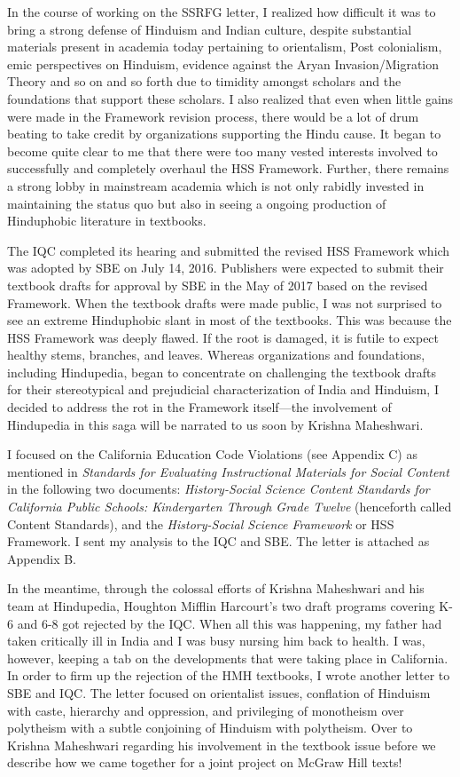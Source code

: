 In the course of working on the SSRFG letter, I realized how difficult it was to bring a strong defense of Hinduism and Indian culture, despite substantial materials present in academia today pertaining to orientalism, Post colonialism, emic perspectives on Hinduism, evidence against the Aryan Invasion/Migration Theory and so on and so forth due to timidity amongst scholars and the foundations that support these scholars. I also realized that even when little gains were made in the Framework revision process, there would be a lot of drum beating to take credit by organizations supporting the Hindu cause. It began to become quite clear to me that there were too many vested interests involved to successfully and completely overhaul the HSS Framework. Further, there remains a strong lobby in mainstream academia which is not only rabidly invested in maintaining the status quo but also in seeing a ongoing production of Hinduphobic literature in textbooks. 

The IQC completed its hearing and submitted the revised HSS Framework which was adopted by SBE on July 14, 2016. Publishers were expected to submit their textbook drafts for approval by SBE in the May of 2017 based on the revised Framework. When the textbook drafts were made public, I was not surprised to see an extreme Hinduphobic slant in most of the textbooks. This was because the HSS Framework was deeply flawed. If the root is damaged, it is futile to expect healthy stems, branches, and leaves. Whereas organizations and foundations, including Hindupedia, began to concentrate on challenging the textbook drafts for their stereotypical and prejudicial characterization of India and Hinduism, I decided to address the rot in the Framework itself—the involvement of Hindupedia in this saga will be narrated to us soon by Krishna Maheshwari. 

I focused on the California Education Code Violations (see Appendix C) as mentioned in \textit{Standards for Evaluating Instructional Materials for Social Content} in the following two documents: \textit{History-Social Science Content Standards for California Public Schools: Kindergarten Through Grade Twelve} (henceforth called Content Standards), and the \textit{History-Social Science Framework} or HSS Framework. I sent my analysis to the IQC and SBE. The letter is attached as Appendix B. 

In the meantime, through the colossal efforts of Krishna Maheshwari and his team at Hindupedia, Houghton Mifflin Harcourt’s two draft programs covering K-6 and 6-8 got rejected by the IQC. When all this was happening, my father had taken critically ill in India and I was busy nursing him back to health. I was, however, keeping a tab on the developments that were taking place in California. In order to firm up the rejection of the HMH textbooks, I wrote another letter to SBE and IQC. The letter focused on orientalist issues, conflation of Hinduism with caste, hierarchy and oppression, and privileging of monotheism over polytheism with a subtle conjoining of Hinduism with polytheism. Over to Krishna Maheshwari regarding his involvement in the textbook issue before we describe how we came together for a joint project on McGraw Hill texts! 

